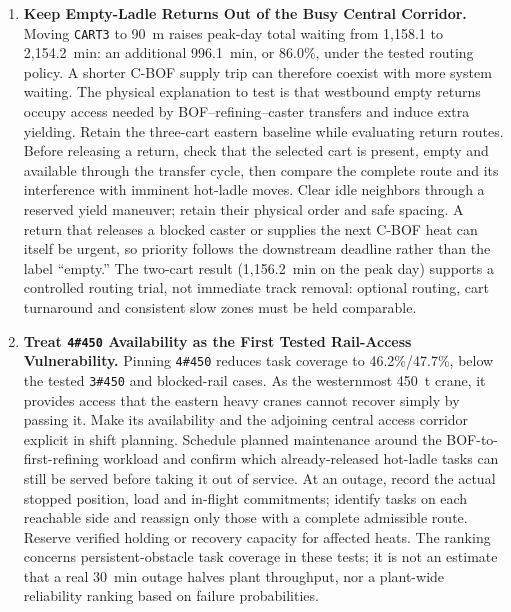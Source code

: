 \documentclass[11pt,a4paper]{article}
\begin{document}
\begin{enumerate}[leftmargin=1.5em,itemsep=5pt]
  \item \textbf{Keep Empty-Ladle Returns Out of the Busy Central Corridor.}
  Moving \texttt{CART3} to 90~m raises peak-day total waiting from 1,158.1 to 2,154.2~min: an additional 996.1~min, or 86.0\%, under the tested routing policy. A shorter C-BOF supply trip can therefore coexist with more system waiting. The physical explanation to test is that westbound empty returns occupy access needed by BOF--refining--caster transfers and induce extra yielding. Retain the three-cart eastern baseline while evaluating return routes. Before releasing a return, check that the selected cart is present, empty and available through the transfer cycle, then compare the complete route and its interference with imminent hot-ladle moves. Clear idle neighbors through a reserved yield maneuver; retain their physical order and safe spacing. A return that releases a blocked caster or supplies the next C-BOF heat can itself be urgent, so priority follows the downstream deadline rather than the label ``empty.'' The two-cart result (1,156.2~min on the peak day) supports a controlled routing trial, not immediate track removal: optional routing, cart turnaround and consistent slow zones must be held comparable.

  \item \textbf{Treat \texttt{4\#450} Availability as the First Tested Rail-Access Vulnerability.}
  Pinning \texttt{4\#450} reduces task coverage to 46.2\%/47.7\%, below the tested \texttt{3\#450} and blocked-rail cases. As the westernmost 450~t crane, it provides access that the eastern heavy cranes cannot recover simply by passing it. Make its availability and the adjoining central access corridor explicit in shift planning. Schedule planned maintenance around the BOF-to-first-refining workload and confirm which already-released hot-ladle tasks can still be served before taking it out of service. At an outage, record the actual stopped position, load and in-flight commitments; identify tasks on each reachable side and reassign only those with a complete admissible route. Reserve verified holding or recovery capacity for affected heats. The ranking concerns persistent-obstacle task coverage in these tests; it is not an estimate that a real 30~min outage halves plant throughput, nor a plant-wide reliability ranking based on failure probabilities.


\end{enumerate}
\end{document}

